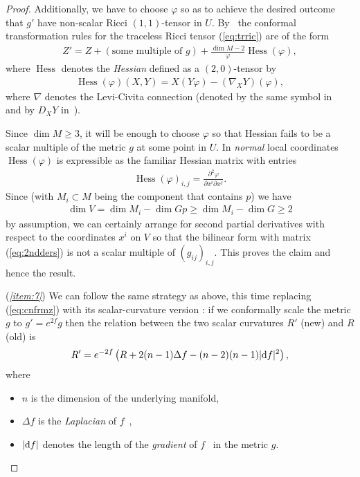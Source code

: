 \documentclass[10pt,a4paper]{amsart}
\numberwithin{equation}{section}
\begin{document}
\begin{proof}
 Additionally, we have to choose $\varphi$ so as to achieve the desired outcome that $g'$ have non-scalar Ricci $(1,1)$-tensor in $U$. By~\cite[equation (1.161b)]{bes} the conformal transformation rules for the traceless Ricci tensor (\ref{eq:trric}) are of the form
 \begin{gather}\label{eq:cnfrmz}
 Z' = Z + (\text{some multiple of }g) + \frac{\dim M-2}{\varphi}\operatorname{Hess}(\varphi),
 \end{gather}
 where $\operatorname{Hess}$ denotes the {\it Hessian} defined \cite[Section~1.54]{bes} as a $(2,0)$-tensor by
 \begin{gather*}
 \operatorname{Hess}(\varphi)(X,Y) = X(Y\varphi) - (\nabla_XY)(\varphi),
 \end{gather*}
 where $\nabla$ denotes the Levi-Civita connection (denoted by the same symbol in~\cite[Section~IV.2]{kn1} and by $D_{X}Y$ in~\cite[Section~1.41]{bes}).

 Since $\dim M\ge 3$, it will be enough to choose $\varphi$ so that Hessian fails to be a scalar multiple of the metric $g$ at some point in $U$. In {\it normal} \cite[Section~1.44]{bes} local coordinates $\operatorname{Hess}(\varphi)$ is expressible as the familiar Hessian matrix with entries
 \begin{gather}\label{eq:2ndders}
 \operatorname{Hess}(\varphi)_{i,j} = \frac{\partial^2 \varphi}{\partial x^i \partial x^j}.
 \end{gather}
 Since (with $M_i\subset M$ being the component that contains $p$) we have
 \begin{gather*}
 \dim V = \dim M_i - \dim Gp\ge \dim M_i-\dim G\ge 2
 \end{gather*}
 by assumption, we can certainly arrange for second partial derivatives with respect to the coordinates $x^i$ on $V$ so that the bilinear form with matrix (\ref{eq:2ndders}) is not a scalar multiple of $(g_{ij})_{i,j}$. This proves the claim and hence the result.

 ({\it \ref{item:7}}) We can follow the same strategy as above, this time replacing (\ref{eq:cnfrmz}) with its scalar-curvature version \cite[Theorem~1.159(f)]{bes}: if we conformally scale the metric $g$ to $g'=e^{2f}g$ then the relation between the two scalar curvatures $R'$ (new) and $R$ (old) is
 \begin{gather*}
 R' = e^{-2f}\left(R + 2(n-1)\Delta f - (n-2)(n-1)|{\rm d}f|^2\right),
 \end{gather*}
 where
 \begin{itemize}\itemsep=0pt
 \item $n$ is the dimension of the underlying manifold,
 \item $\Delta f$ is the {\it Laplacian} of $f$~\cite[Section~1.54c]{bes},
 \item $|{\rm d}f|$ denotes the length of the {\it gradient} of $f$~\cite[Section~1.54a]{bes} in the metric $g$.
 \end{itemize}


\end{proof}
\end{document}
